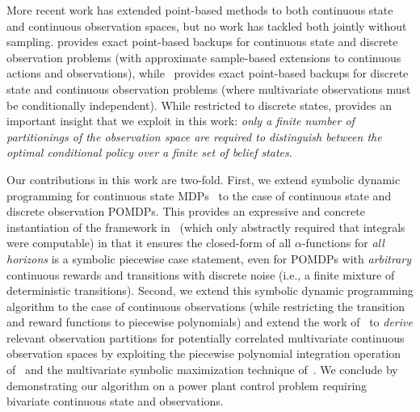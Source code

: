 \documentclass{article} %
\begin{document}
More recent work has extended point-based methods to both continuous
state and continuous observation spaces, but no work has tackled both
jointly without sampling.  \cite{Perseus_cont} provides exact
point-based backups for continuous state and discrete observation
problems (with approximate sample-based extensions to continuous
actions and observations), while~\cite{pascal_ijcai05} provides exact
point-based backups for discrete state and continuous observation
problems (where multivariate observations must be conditionally
independent).  While
restricted to discrete states, \cite{pascal_ijcai05} provides an
important insight that we exploit in this work: \emph{only a finite
number of partitionings of the observation space are required to
distinguish between the optimal conditional policy over a finite set
of belief states}.

Our contributions in this work are two-fold.  First, we extend
symbolic dynamic programming for continuous state
MDPs~\cite{sanner_uai11} to the case of continuous state and discrete
observation POMDPs.  This provides an expressive and concrete
instantiation of the framework in~\cite{Perseus_cont} (which only
abstractly required that integrals were computable) in that it ensures
the closed-form of all $\alpha$-functions for \emph{all horizons} is a
symbolic piecewise case statement, even for POMDPs with
\emph{arbitrary} continuous rewards and transitions with discrete
noise (i.e., a finite mixture of deterministic transitions).  
Second, we extend this symbolic dynamic programming algorithm
to the case of continuous observations (while restricting the
transition and reward functions to piecewise polynomials) and extend
the work of~\cite{pascal_ijcai05} to \emph{derive} relevant observation
partitions for potentially correlated multivariate continuous
observation spaces by exploiting the piecewise polynomial integration
operation of~\cite{sanner_aaai12} and the multivariate symbolic maximization
technique of~\cite{sanner_uai11}.  
We conclude by demonstrating our algorithm on a power plant
control problem requiring bivariate continuous state and observations.


\end{document}
